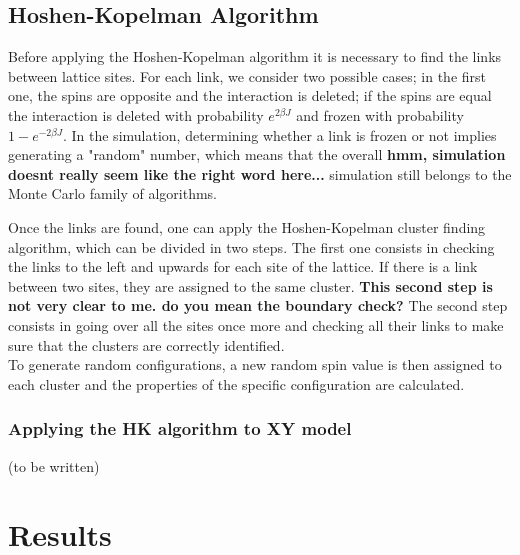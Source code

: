 \documentclass[twoside]{article}
\begin{document}
\begin{multicols}{2}
\subsection{Hoshen-Kopelman Algorithm} \label{hk_al}
Before applying the Hoshen-Kopelman algorithm it is necessary to find the links between lattice sites. For each link, we consider two possible cases; in the first one, the spins are opposite and the interaction is deleted; if the spins are equal the interaction is deleted with probability $e^{2\beta J}$ and frozen with probability $1-e^{-2\beta J}$.
In the simulation, determining whether a link is frozen or not implies generating a "random" number, which means that the overall \textbf{hmm, simulation doesnt really seem like the right word here...} simulation still belongs to the Monte Carlo family of algorithms. 

Once the links are found, one can apply the Hoshen-Kopelman cluster finding algorithm, which can be divided in two steps.
The first one consists in checking the links to the left and upwards for each site of the lattice. If there is a link between two sites, they are assigned to the same cluster. \textbf{This second step is not very clear to me. do you mean the boundary check?} The second step consists in going over all the sites once more and checking all their links to make sure that the clusters are correctly identified. \\ To generate random configurations, a new random spin value is then assigned to each cluster and the properties of the specific configuration are calculated.

\subsubsection{Applying the HK algorithm to XY model}
(to be written)

\section{Results}


\end{multicols}
\end{document}
